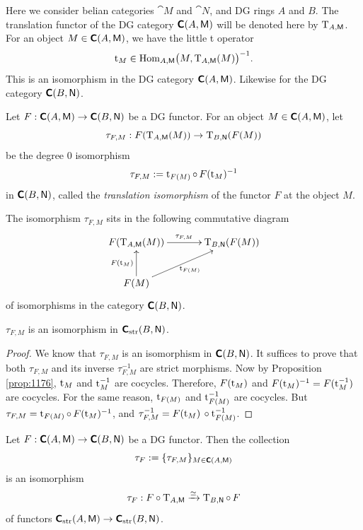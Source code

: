 
Here we consider \lb belian categories $\cat{M}$ and $\cat{N}$, 
and DG rings $A$ and $B$.
The translation functor of the DG category $\boldsymbol{\mathsf{C}}(A, \operatorname{\mathsf{M}})$ will be 
denoted here by $\operatorname{T}_{A, \operatorname{\mathsf{M}}}$. 
For an object $M \in \boldsymbol{\mathsf{C}}(A, \operatorname{\mathsf{M}})$, we have the little t operator 
\[ \operatorname{t}_M \in \operatorname{Hom}_{A, \operatorname{\mathsf{M}}} \bigl( M, \operatorname{T}_{A, \operatorname{\mathsf{M}}}(M) 
\bigr)^{-1} . \]
This is an isomorphism in the DG category $\boldsymbol{\mathsf{C}}(A, \operatorname{\mathsf{M}})$. 
Likewise for the DG category $\boldsymbol{\mathsf{C}}(B, \operatorname{\mathsf{N}})$.

\begin{dfn} \label{dfn:1150}
Let 
$F : \boldsymbol{\mathsf{C}}(A, \operatorname{\mathsf{M}}) \to \boldsymbol{\mathsf{C}}(B, \operatorname{\mathsf{N}})$
be a DG functor.
For an object $M \in \boldsymbol{\mathsf{C}}(A, \operatorname{\mathsf{M}})$, let 
\[ \tau_{F, M} : F(\operatorname{T}_{A, \operatorname{\mathsf{M}}}(M)) \to \operatorname{T}_{B, \operatorname{\mathsf{N}}}(F(M)) \]
be the degree $0$ isomorphism
\[ \tau_{F, M} := \operatorname{t}_{F(M)} \circ \, F(\operatorname{t}_M)^{-1}  \]
in $\boldsymbol{\mathsf{C}}(B, \operatorname{\mathsf{N}})$, called the {\em translation isomorphism}
of the functor $F$ at the object $M$. 
\end{dfn}

The isomorphism $\tau_{F, M}$ sits in the following commutative diagram
\[ \UseTips  \xymatrix @C=8ex @R=6ex {
F(\opn{T}_{A, \cat{M}}(M))
\ar[r]^{\tau_{F, M}}
&
\opn{T}_{B, \cat{N}}(F(M))
\\
F(M)
\ar[u]^{ F(\opn{t}_M) } 
\ar[ur]_{ \opn{t}_{F(M)} }
} \]
of isomorphisms in the category $\boldsymbol{\mathsf{C}}(B, \operatorname{\mathsf{N}})$.

\begin{prop} \label{prop:1179}
$\tau_{F, M}$ is an isomorphism in $\boldsymbol{\mathsf{C}}_{\mathrm{str}}(B, \operatorname{\mathsf{N}})$.
\end{prop}

\begin{proof}
We know that $\tau_{F, M}$ is an isomorphism in $\boldsymbol{\mathsf{C}}(B, \operatorname{\mathsf{N}})$.
It suffices to prove that both $\tau_{F, M}$ and its inverse  
$\tau_{F, M}^{-1}$ are 
strict morphisms. Now by Proposition \ref{prop:1176}, $\operatorname{t}_M$ and 
$\operatorname{t}_M^{-1}$ are cocycles. Therefore, $F(\operatorname{t}_M)$ and 
$F(\operatorname{t}_M)^{-1} = F(\operatorname{t}_M^{-1})$ are cocycles. For the same reason,
$\operatorname{t}_{F(M)}$ and $\operatorname{t}_{F(M)}^{-1}$  are cocycles. But 
$\tau_{F, M} = \operatorname{t}_{F(M)} \circ \, F(\operatorname{t}_M)^{-1}$, and 
$\tau_{F, M}^{-1} = F(\operatorname{t}_M) \, \circ \operatorname{t}_{F(M)}^{-1}$.
\end{proof}

\begin{thm} \label{thm:1150}
Let 
$F : \boldsymbol{\mathsf{C}}(A, \operatorname{\mathsf{M}}) \to \boldsymbol{\mathsf{C}}(B, \operatorname{\mathsf{N}})$
be a DG functor. Then the collection
\[ \tau_F := \{ \tau_{F, M} \}_{M \in \boldsymbol{\mathsf{C}}(A, \operatorname{\mathsf{M}})} \] 
is an isomorphism 
\[ \tau_F : F \circ \operatorname{T}_{A, \operatorname{\mathsf{M}}} \xrightarrow{\simeq} \operatorname{T}_{B, \operatorname{\mathsf{N}}} \circ \, F \]
of functors 
$\boldsymbol{\mathsf{C}}_{\mathrm{str}}(A, \operatorname{\mathsf{M}}) \to \boldsymbol{\mathsf{C}}_{\mathrm{str}}(B, \operatorname{\mathsf{N}})$.
\end{thm}


